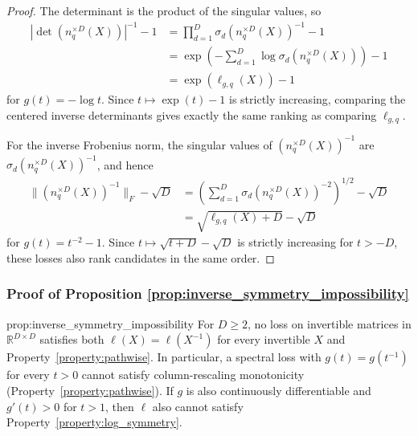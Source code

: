 \begin{proof}
The determinant is the product of the singular values, so
\begin{align}
|\det(n_q^{\times D}(X))|^{-1}-1
&=\prod_{d=1}^D\sigma_d(n_q^{\times D}(X))^{-1}-1 \\
&=\exp\left(-\sum_{d=1}^D\log\sigma_d(n_q^{\times D}(X))\right)-1 \\
&=\exp(\ell_{g,q}(X))-1
\end{align}
for $g(t)=-\log t$.
Since $t\mapsto\exp(t)-1$ is strictly increasing, comparing the centered inverse determinants gives exactly the same ranking as comparing $\ell_{g,q}$.

For the inverse Frobenius norm, the singular values of $(n_q^{\times D}(X))^{-1}$ are $\sigma_d(n_q^{\times D}(X))^{-1}$, and hence
\begin{align}
\|(n_q^{\times D}(X))^{-1}\|_F-\sqrt D
&=\left(\sum_{d=1}^D\sigma_d(n_q^{\times D}(X))^{-2}\right)^{1/2}-\sqrt D \\
&=\sqrt{\ell_{g,q}(X)+D}-\sqrt D
\end{align}
for $g(t)=t^{-2}-1$.
Since $t\mapsto\sqrt{t+D}-\sqrt D$ is strictly increasing for $t>-D$, these losses also rank candidates in the same order.

\end{proof}

\subsubsection{Proof of Proposition \ref{prop:inverse_symmetry_impossibility}}
\label{proof:inverse_symmetry_impossibility}

\begin{restatedproposition}{prop:inverse_symmetry_impossibility}
For $D\geq2$, no loss on invertible matrices in $\mathbb R^{D\times D}$ satisfies both $\ell(X)=\ell(X^{-1})$ for every invertible $X$ and Property~\ref{property:pathwise}.
In particular, a spectral loss with $g(t)=g(t^{-1})$ for every $t>0$ cannot satisfy column-rescaling monotonicity (Property~\ref{property:pathwise}).
If $g$ is also continuously differentiable and $g'(t)>0$ for $t>1$, then $\ell$ also cannot satisfy Property~\ref{property:log_symmetry}.
\end{restatedproposition}


